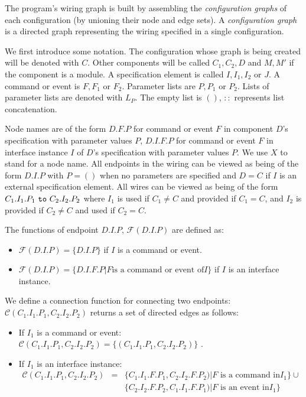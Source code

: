 \documentclass[11pt]{article}
\newcommand{\kw}[1]{{\tt #1}}
\newcommand{\FSE}{\mathcal{F}}
\newcommand{\connect}{\mathcal{C}}
\begin{document}
The program's wiring graph is built by assembling the \emph{configuration
graphs} of each configuration (by unioning their node and edge sets).
A \emph{configuration graph} is a directed graph representing the wiring
specified in a single configuration.

We first introduce some notation. The configuration whose graph is being
created will be denoted with $C$. Other components will be called $C_1,
C_2, D$ and $M, M'$ if the component is a module. A specification element
is called $I, I_1, I_2$ or $J$.  A command or event is $F, F_1$ or
$F_2$. Parameter lists are $P, P_1$ or $P_2$. Lists of parameter lists are
denoted with $L_P$. The empty list is $()$, $::$ represents list
concatenation.

Node names are of the form $D.F.P$ for command or event $F$ in component
$D$'s specification with parameter values $P$, $D.I.F.P$ for command or
event $F$ in interface instance $I$ of $D$'s specification with parameter
values $P$. We use $X$ to stand for a node name. All endpoints in the
wiring can be viewed as being of the form $D.I.P$ with $P = ()$ when no
parameters are specified and $D = C$ if $I$ is an external specification
element.  All wires can be viewed as being of the form $C_1.I_1.P_1 \kw{\
to\ } C_2.I_2.P_2$ where $I_1$ is used if $C_1 \not= C$ and provided if
$C_1 = C$, and $I_2$ is provided if $C_2 \not= C$ and used if $C_2 = C$.

The functions of endpoint $D.I.P$, $\FSE(D.I.P)$ are defined as:
\begin{itemize}
\item $\FSE(D.I.P) = \{ D.I.P \}$ if $I$ is a command or event.
\item $\FSE(D.I.P) = \{ D.I.F.P | F \mbox{is a command or event of} I \}$ if
$I$ is an interface instance.
\end{itemize}

We define a connection function for connecting two endpoints:
$\connect(C_1.I_1.P_1, C_2.I_2.P_2)$ returns a set of directed edges as
follows:
\begin{itemize}
\item If $I_1$ is a command or event: $\connect(C_1.I_1.P_1, C_2.I_2.P_2) = \{ (C_1.I_1.P_1, C_2.I_2.P_2)
\}$ .
\item If $I_1$ is an interface instance: 
\begin{eqnarray*}
\connect(C_1.I_1.P_1, C_2.I_2.P_2) & = &
\{ C_1.I_1.F.P_1, C_2.I_2.F.P_2) | F \mbox{ is a command in} I_1 \} \cup \\
& & \{ C_2.I_2.F.P_2, C_1.I_1.F.P_1) | F \mbox{ is an event in} I_1 \}
\end{eqnarray*}
\end{itemize}
\end{document}
